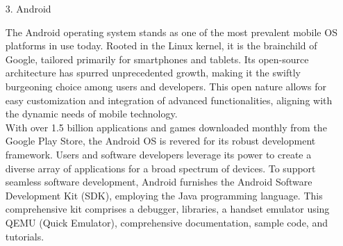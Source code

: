 \documentclass[conference]{IEEEtran}
\begin{document}
\begin{enumerate}
\begin{enumerate}
    \item[3.] Android \cite{singh2014overview}
    \item[]The Android operating system stands as one of the most prevalent mobile OS platforms in use today. Rooted in the Linux kernel, it is the brainchild of Google, tailored primarily for smartphones and tablets. Its open-source architecture has spurred unprecedented growth, making it the swiftly burgeoning choice among users and developers. This open nature allows for easy customization and integration of advanced functionalities, aligning with the dynamic needs of mobile technology.\\
    With over 1.5 billion applications and games downloaded monthly from the Google Play Store, the Android OS is revered for its robust development framework. Users and software developers leverage its power to create a diverse array of applications for a broad spectrum of devices. To support seamless software development, Android furnishes the Android Software Development Kit (SDK), employing the Java programming language. This comprehensive kit comprises a debugger, libraries, a handset emulator using QEMU (Quick Emulator), comprehensive documentation, sample code, and tutorials.\\


\end{enumerate}
\end{enumerate}
\end{document}
